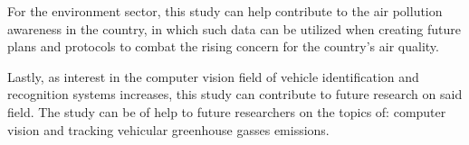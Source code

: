 For the environment sector, this study can help contribute to the air pollution awareness in the country, in which such data can be utilized when creating future plans and protocols to combat the rising concern for the country’s air quality.

Lastly, as interest in the computer vision field of vehicle identification and recognition systems increases, this study can contribute to future research on said field. The study can be of help to future researchers on the topics of: computer vision and tracking vehicular greenhouse gasses emissions.



\begin{comment}
If applicable, describe possible commercialization and/or innovation in your research.
\end{comment}


